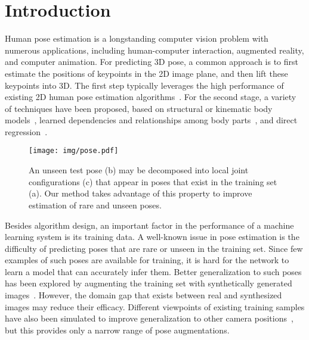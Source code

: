 \documentclass[runningheads]{llncs}
\begin{document}
\section{Introduction}
\label{sec:intro}

Human pose estimation is a longstanding computer vision problem with numerous applications, including human-computer interaction, augmented reality, and computer animation. For predicting 3D pose, a common approach is to first estimate the positions of keypoints in the 2D image plane, and then lift these keypoints into 3D. The first step typically leverages the high performance of existing 2D human pose estimation algorithms~\cite{chen2018cascaded,newell2016stacked,sun2019deep}. For the second stage, a variety of techniques have been proposed, based on structural or kinematic body models~\cite{cai2019exploiting,dabral2018learning,fang2018learning,lee2018propagating,wandt2019repnet}, learned dependencies and relationships among body parts~\cite{fang2018learning,park20183d}, and direct regression~\cite{martinez2017simple}.

\begin{figure}[t]
\begin{center}
\texttt{[image: img/pose.pdf]}

\end{center}
\caption{An unseen test pose (b) may be decomposed into local joint configurations (c) that appear in poses that exist in the training set (a). Our method takes advantage of this property to improve estimation of rare and unseen poses.}
\label{fig:date_fig}
\end{figure}

Besides algorithm design, an important factor in the performance of a machine learning system is its training data. A well-known issue in pose estimation is the difficulty of predicting poses that are rare or unseen in the training set. Since few examples of such poses are available for training, it is hard for the network to learn a model that can accurately infer them. Better generalization to such poses has been explored by augmenting the training set with synthetically generated images~\cite{rogez2016mocap,chen2016synthesizing,varol2017learning,wang2019generalizing,mehta2017monocular,jahangiri2017generating}. However, the domain gap that exists between real and synthesized images may reduce their efficacy. Different viewpoints of existing training samples have also been simulated to improve generalization to other camera positions~\cite{fang2018learning}, but this provides only a narrow range of pose augmentations.
\end{document}
